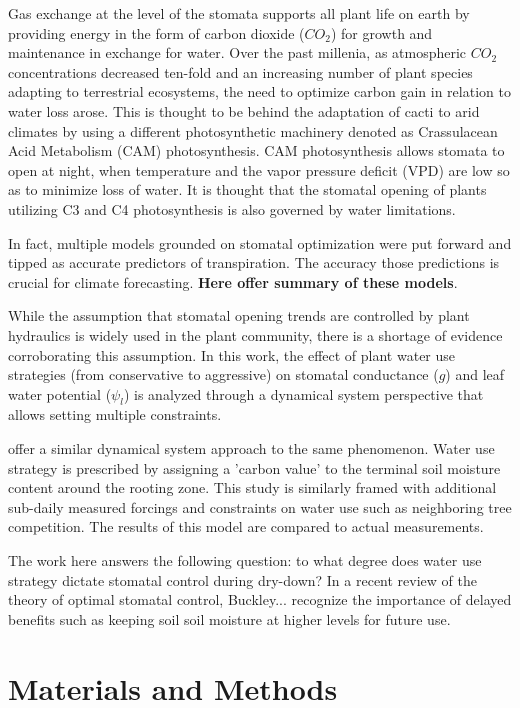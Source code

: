 \documentclass[utf8]{frontiersSCNS} %
\begin{document}
Gas exchange at the level of the stomata supports all plant life on earth by providing energy in the form of carbon dioxide ($CO_2$) for growth and maintenance in exchange for water. Over the past millenia, as atmospheric $CO_2$ concentrations decreased ten-fold and an increasing number of plant species adapting to terrestrial ecosystems, the need to optimize carbon gain in relation to water loss arose. This is thought to be behind the adaptation of cacti to arid climates by using a different photosynthetic machinery denoted as Crassulacean Acid Metabolism (CAM) photosynthesis. CAM photosynthesis allows stomata to open at night, when temperature and the vapor pressure deficit (VPD) are low so as to minimize loss of water. It is thought that the stomatal opening of plants utilizing C3 and C4 photosynthesis is also governed by water limitations.

In fact, multiple models grounded on stomatal optimization were put forward and tipped as accurate predictors of transpiration. The accuracy those predictions is crucial for climate forecasting. \textbf{Here offer summary of these models}.

While the assumption that stomatal opening trends are controlled by plant hydraulics is widely used in the plant community, there is a shortage of evidence corroborating this assumption. In this work, the effect of plant water use strategies (from conservative to aggressive) on stomatal conductance ($g$) and leaf water potential ($\psi_l$) is analyzed through a dynamical system perspective that allows setting multiple constraints. 

\citet{Manzoni2013} offer a similar dynamical system approach to the same phenomenon. Water use strategy is prescribed by assigning a 'carbon value' to the terminal soil moisture content around the rooting zone. This study is similarly framed with additional sub-daily measured forcings and constraints on water use such as neighboring tree competition. The results of this model are compared to actual measurements.

The work here answers the following question: to what degree does water use strategy dictate stomatal control during dry-down? In a recent review of the theory of optimal stomatal control, Buckley... recognize the importance of delayed benefits such as keeping soil soil moisture at higher levels for future use. 

\section{Materials and Methods}
\end{document}

